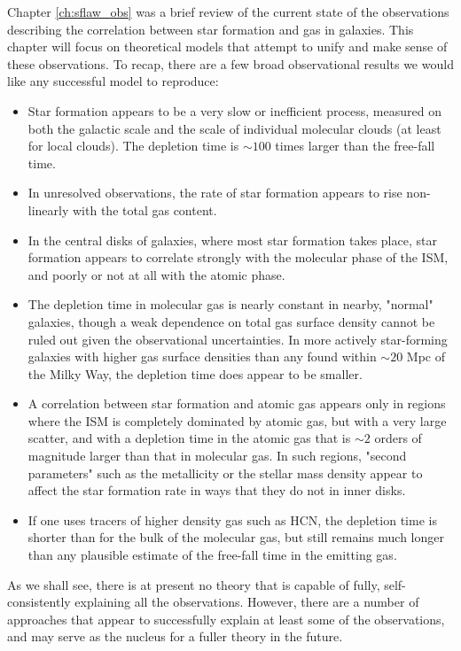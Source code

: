 Chapter \ref{ch:sflaw_obs} was a brief review of the current state of the observations describing the correlation between star formation and gas in galaxies. This chapter will focus on theoretical models that attempt to unify and make sense of these observations. To recap, there are a few broad observational results we would like any successful model to reproduce:
\begin{itemize}
\item Star formation appears to be a very slow or inefficient process, measured on both the galactic scale and the scale of individual molecular clouds (at least for local clouds). The depletion time is $\sim 100$ times larger than the free-fall time.
\item In unresolved observations, the rate of star formation appears to rise non-linearly with the total gas content.
\item In the central disks of galaxies, where most star formation takes place, star formation appears to correlate strongly with the molecular phase of the ISM, and poorly or not at all with the atomic phase.
\item The depletion time in molecular gas is nearly constant in nearby, "normal" galaxies, though a weak dependence on total gas surface density cannot be ruled out given the observational uncertainties. In more actively star-forming galaxies with higher gas surface densities than any found within $\sim 20$ Mpc of the Milky Way, the depletion time does appear to be smaller.
\item  A correlation between star formation and atomic gas appears only in regions where the ISM is completely dominated by atomic gas, but with a very large scatter, and with a depletion time in the atomic gas that is $\sim 2$ orders of magnitude larger than that in molecular gas. In such regions, "second parameters" such as the metallicity or the stellar mass density appear to affect the star formation rate in ways that they do not in inner disks.
\item If one uses tracers of higher density gas such as HCN, the depletion time is shorter than for the bulk of the molecular gas, but still remains much longer than any plausible estimate of the free-fall time in the emitting gas.
\end{itemize}
As we shall see, there is at present no theory that is capable of fully, self-consistently explaining all the observations. However, there are a number of approaches that appear to successfully explain at least some of the observations, and may serve as the nucleus for a fuller theory in the future.

